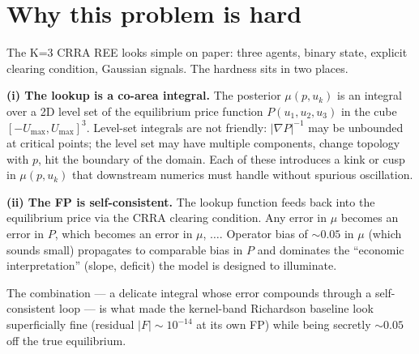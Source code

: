 \documentclass[11pt]{article}
\begin{document}
\begin{abstract}
\end{abstract}

\tableofcontents
\newpage

\section{Why this problem is hard}

The K=3 CRRA REE looks simple on paper: three agents, binary state,
explicit clearing condition, Gaussian signals. The hardness sits in
two places.

\textbf{(i) The lookup is a co-area integral.} The posterior
$\mu(p, u_k)$ is an integral over a 2D level set of the equilibrium
price function $P(u_1, u_2, u_3)$ in the cube
$[-U_{\max}, U_{\max}]^3$. Level-set integrals are not friendly:
$|\nabla P|^{-1}$ may be unbounded at critical points; the level set
may have multiple components, change topology with $p$, hit the
boundary of the domain. Each of these introduces a kink or cusp in
$\mu(p, u_k)$ that downstream numerics must handle without spurious
oscillation.

\textbf{(ii) The FP is self-consistent.} The lookup function feeds
back into the equilibrium price via the CRRA clearing condition. Any
error in $\mu$ becomes an error in $P$, which becomes an error in
$\mu$, $\ldots$. Operator bias of $\sim 0.05$ in $\mu$ (which sounds
small) propagates to comparable bias in $P$ and dominates the
``economic interpretation'' (slope, deficit) the model is designed to
illuminate.

The combination --- a delicate integral whose error compounds through
a self-consistent loop --- is what made the kernel-band Richardson
baseline look superficially fine (residual $|F| \sim 10^{-14}$ at its
own FP) while being secretly $\sim 0.05$ off the true equilibrium.
\end{document}

